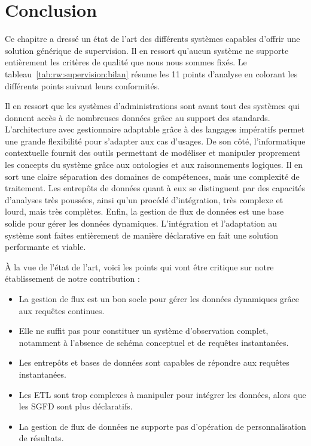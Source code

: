 \section{Conclusion}
Ce chapitre a dressé un état de l'art des différents systèmes capables d'offrir une solution générique de supervision. Il en ressort qu'aucun système ne supporte entièrement les critères de qualité que nous nous sommes fixés. Le tableau~\ref{tab:rw:supervision:bilan} résume les 11 points d'analyse en colorant les différents points suivant leurs conformités. 

Il en ressort que les systèmes d'administrations sont avant tout des systèmes qui donnent accès à de nombreuses données grâce au support des standards. L'architecture avec gestionnaire adaptable grâce à des langages impératifs permet une grande flexibilité pour s'adapter aux cas d'usages. De son côté, l'informatique contextuelle fournit des outils permettant de modéliser et manipuler proprement les concepts du système grâce aux ontologies et aux raisonnements logiques. Il en sort une claire séparation des domaines de compétences, mais une complexité de traitement. Les entrepôts de données quant à eux se distinguent par des capacités d'analyses très poussées, ainsi qu'un procédé d'intégration, très complexe et lourd, mais très complètes. Enfin, la gestion de flux de données est une base solide pour gérer les données dynamiques. L'intégration et l'adaptation au système sont faites entièrement de manière déclarative en fait une solution performante et viable.

À la vue de l'état de l'art, voici les points qui vont être critique sur notre établissement de notre contribution :
\begin{itemize}
    \item La gestion de flux est un bon socle pour gérer les données dynamiques grâce aux requêtes continues.
    \item Elle ne suffit pas pour constituer un système d'observation complet, notamment à l'absence de schéma conceptuel et de requêtes instantanées.
    \item Les entrepôts et bases de données sont capables de répondre aux requêtes instantanées.
    \item Les ETL sont trop complexes à manipuler pour intégrer les données, alors que les SGFD sont plus déclaratifs.
    \item La gestion de flux de données ne supporte pas d'opération de personnalisation de résultats.
\end{itemize}

